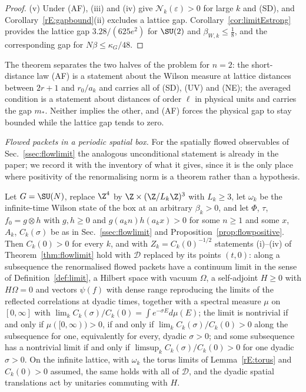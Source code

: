 \begin{proof}
(v) Under (AF), (iii) and (iv) give $\mathcal N_k(\varepsilon)>0$ for large
$k$ and (SD), and Corollary~\ref{rE:gapbound}(ii) excludes a lattice gap.
Corollary~\ref{cor:limitEstrong} provides the lattice gap $3.28/(625e^2)$
for $\SU(2)$ and $\beta_{W,k}\le\frac18$, and \cite[Corollary~322]{BBLR26}
the corresponding gap for $N\beta\le\kappa_G/48$.
\end{proof}

The theorem separates the two halves of the problem for $n=2$: the
short-distance law (AF) is a statement about the Wilson measure at lattice
distances between $2r+1$ and $r_0/a_k$ and carries all of (SD), (UV) and
(NE); the averaged condition is a statement about distances of order $\ell$
in physical units and carries the gap $m_*$. Neither implies the other, and
(AF) forces the physical gap to stay bounded while the lattice gap tends to
zero.

\emph{Flowed packets in a periodic spatial box.} For the spatially flowed
observables of Sec.~\ref{ssec:flowlimit} the analogous unconditional
statement is already in the paper; we record it with the inventory of what
it gives, since it is the only place where positivity of the renormalising
norm is a theorem rather than a hypothesis.

\begin{proposition}\label{rE:flow}
Let $G=\SU(N)$, replace $\Z^4$ by $\Z\times(\Z/L_k\Z)^3$ with $L_k\ge3$, let
$\omega_k$ be the infinite-time Wilson state of the box at an arbitrary
$\beta_k>0$, and let $\Phi$, $\tau$, $f_0=g\otimes h$ with $g,h\ge0$ and
$g(a_kn)h(a_kx)>0$ for some $n\ge1$ and some $x$, $A_k$, $C_k(\sigma)$ be as
in Sec.~\textup{\ref{ssec:flowlimit}} and
Proposition~\textup{\ref{prop:flowpositive}}. Then $C_k(0)>0$ for every $k$,
and with $Z_k=C_k(0)^{-1/2}$ statements \textup{(i)}--\textup{(iv)} of
Theorem~\textup{\ref{thm:flowlimit}} hold with $\mathcal D$ replaced by its
points $(t,0)$: along a subsequence the renormalised flowed packets have a
continuum limit in the sense of Definition~\textup{\ref{def:limit}}, a
Hilbert space with vacuum $\Omega$, a self-adjoint $H\ge0$ with $H\Omega=0$
and vectors $\psi(f)$ with dense range reproducing the limits of the
reflected correlations at dyadic times, together with a spectral measure
$\mu$ on $[0,\infty]$ with $\lim_kC_k(\sigma)/C_k(0)=\int e^{-\sigma E}d\mu(E)$;
the limit is nontrivial if and only if $\mu([0,\infty))>0$, if and only if
$\lim_kC_k(\sigma)/C_k(0)>0$ along the subsequence for one, equivalently
for every, dyadic $\sigma>0$; and some subsequence has a nontrivial limit if
and only if $\limsup_kC_k(\sigma)/C_k(0)>0$ for one dyadic $\sigma>0$. On the infinite
lattice, with $\omega_k$ the torus limits of Lemma~\textup{\ref{rE:torus}}
and $C_k(0)>0$ assumed, the same holds with all of $\mathcal D$, and the
dyadic spatial translations act by unitaries commuting with $H$.
\end{proposition}

